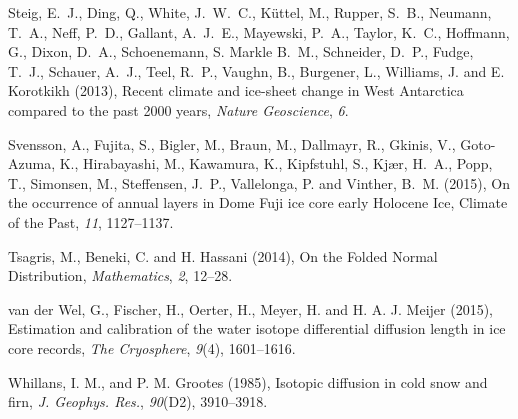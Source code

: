 \documentclass[draft, jgrga]{AGUTeX}
\begin{document}
\begin{article}
\begin{thebibliography}{}
Steig, E.~J., Ding, Q., White, J.~W.~C., Küttel, M., Rupper, S.~B., Neumann, T.~A., Neff, P.~D., Gallant, A.~J.~E., Mayewski, P.~A.,
Taylor, K.~C., Hoffmann, G., Dixon, D.~A., Schoenemann, S. Markle B.~M., Schneider, D.~P., Fudge, T.~J.,
Schauer, A.~J., Teel, R.~P., Vaughn, B., Burgener, L., Williams, J. and E. Korotkikh (2013),
{Recent climate and ice-sheet change in West Antarctica compared to the past 2000 years},
\textit{Nature Geoscience}, \textit{6}.

Svensson, A., Fujita, S., Bigler, M., Braun, M., Dallmayr, R., Gkinis, V.,
Goto-Azuma, K., Hirabayashi, M., Kawamura, K., Kipfstuhl, S., Kjær, H.~A.,
Popp, T., Simonsen, M., Steffensen, J.~P., Vallelonga, P. and Vinther, B.~M. (2015),
{On the occurrence of annual layers in Dome Fuji ice core early Holocene Ice},
{Climate of	the Past}, \textit{11}, 1127--1137.


Tsagris, M., Beneki, C. and H. Hassani (2014),
{On the Folded Normal Distribution},
\textit{Mathematics}, \textit{2}, 12--28.

van der Wel, G., Fischer, H., Oerter, H., Meyer, H. and H. A. J. Meijer (2015),
Estimation and calibration of the water isotope differential diffusion length in ice core records,
\textit{The Cryosphere}, \textit{9}(4), 1601--1616.

Whillans, I. M., and P. M. Grootes (1985),
Isotopic diffusion in cold snow and firn,
\textit{J. Geophys. Res.}, \textit{90}(D2), 3910--3918.







\end{thebibliography}




\end{article}
\end{document}
